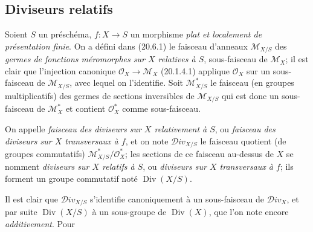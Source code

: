 \subsection{Diviseurs relatifs}
\label{IV.21.15}

\begin{env}[21.15.1]
\label{IV.21.15.1}
Soient $S$ un préschéma, $f:X\to S$ un morphisme \emph{plat et localement de
présentation finie}. On a défini dans (20.6.1) le faisceau d'anneaux
$\mathscr M_{X/S}$ des \emph{germes de fonctions méromorphes sur $X$ relatives à
$S$}, sous-faisceau de $\mathscr M_X$; il est clair que l'injection canonique
$\mathcal O_X\to\mathscr M_X$ (20.1.4.1) applique $\mathcal O_X$ sur un
sous-faisceau de $\mathscr M_{X/S}$, avec lequel on l'identifie. Soit
$\mathscr M_{X/S}^*$ le faisceau (en groupes multiplicatifs) des germes de sections
inversibles de $\mathscr M_{X/S}$ qui est donc un sous-faisceau de $\mathscr M_X^*$
et contient $\mathcal O_X^*$ comme sous-faisceau.
\end{env}

\begin{definition}[21.15.2]
On appelle \emph{faisceau des diviseurs sur $X$ relativement à $S$}, ou
\emph{faisceau des diviseurs sur $X$ transversaux à $f$}, et on note
$\mathscr{D}iv_{X/S}$ le faisceau quotient (de groupes commutatifs)
$\mathscr M_{X/S}^*/\mathcal O_X^*$; les sections de ce faisceau au-dessus de $X$ se
nomment \emph{diviseurs sur $X$ relatifs à $S$}, ou \emph{diviseurs sur $X$
transversaux à $f$}; ils forment un groupe commutatif noté $\operatorname{Div}(X/S)$.
\end{definition}

Il est clair que $\mathscr{D}iv_{X/S}$ s'identifie canoniquement à un sous-faisceau de
$\mathscr{D}iv_X$, et par suite $\operatorname{Div}(X/S)$ à un sous-groupe de
$\operatorname{Div}(X)$, que l'on note encore \emph{additivement}. Pour
